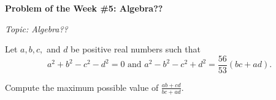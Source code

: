 \begin{potw}\vspace{5pt}
{\large\textbf{Problem of the Week \#5: Algebra??}}\vspace{5pt}

\textit{Topic: Algebra??}\V

Let $a,b,c,$ and $d$ be positive real numbers such that 
\[a^2+b^2-c^2-d^2=0\text{ and } a^2-b^2-c^2+d^2=\frac{56}{53}(bc+ad).\]

Compute the maximum possible value of $\frac{ab+cd}{bc+ad}$.
\end{potw}\V
